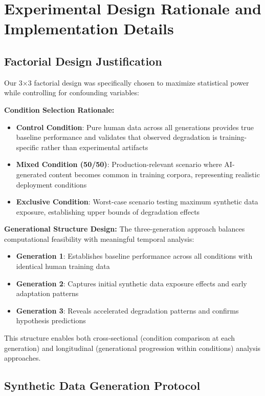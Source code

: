 \documentclass{article}
\begin{document}
\section{Experimental Design Rationale and Implementation Details}
\label{appendix:experimental_design}

\subsection{Factorial Design Justification}

Our 3×3 factorial design was specifically chosen to maximize statistical power while controlling for confounding variables:

\textbf{Condition Selection Rationale:}
\begin{itemize}
    \item \textbf{Control Condition}: Pure human data across all generations provides true baseline performance and validates that observed degradation is training-specific rather than experimental artifacts
    \item \textbf{Mixed Condition (50/50)}: Production-relevant scenario where AI-generated content becomes common in training corpora, representing realistic deployment conditions
    \item \textbf{Exclusive Condition}: Worst-case scenario testing maximum synthetic data exposure, establishing upper bounds of degradation effects
\end{itemize}

\textbf{Generational Structure Design:}
The three-generation approach balances computational feasibility with meaningful temporal analysis:
\begin{itemize}
    \item \textbf{Generation 1}: Establishes baseline performance across all conditions with identical human training data
    \item \textbf{Generation 2}: Captures initial synthetic data exposure effects and early adaptation patterns
    \item \textbf{Generation 3}: Reveals accelerated degradation patterns and confirms hypothesis predictions
\end{itemize}

This structure enables both cross-sectional (condition comparison at each generation) and longitudinal (generational progression within conditions) analysis approaches.

\subsection{Synthetic Data Generation Protocol}
\end{document}
